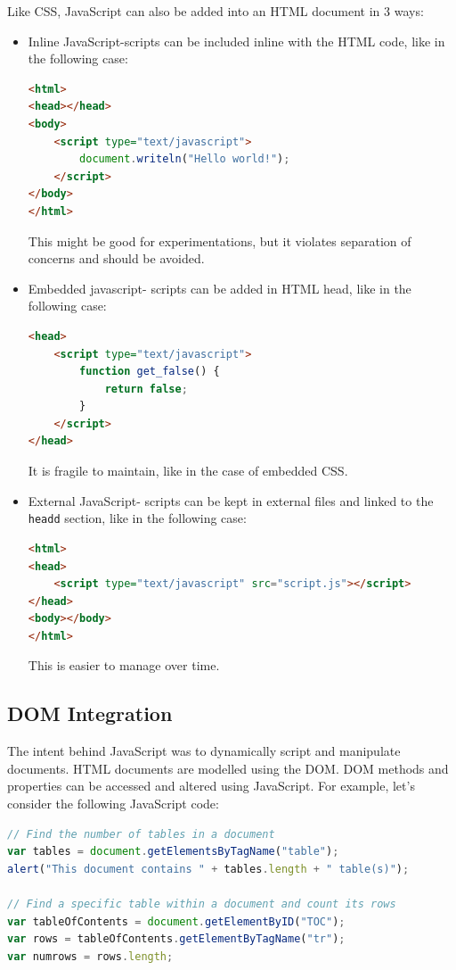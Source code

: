 \documentclass[a4paper, openany]{memoir}
\begin{document}
\noindent Like CSS, JavaScript can also be added into an HTML document in 3 ways:
\begin{itemize}
    \item Inline JavaScript-scripts can be included inline with the HTML code, like in the following case:
    \begin{lstlisting}[language=html]
<html>
<head></head>
<body>
    <script type="text/javascript">
        document.writeln("Hello world!");
    </script>
</body>
</html>\end{lstlisting}
    This might be good for experimentations, but it violates separation of concerns and should be avoided.
    
    \item Embedded javascript- scripts can be added in HTML head, like in the following case:
    \begin{lstlisting}[language=html]
<head>
    <script type="text/javascript">
        function get_false() {
            return false;
        }
    </script>
</head>\end{lstlisting}
    It is fragile to maintain, like in the case of embedded CSS.
    
    \item External JavaScript- scripts can be kept in external files and linked to the \texttt{headd} section, like in the following case:
    \begin{lstlisting}[language=html]
<html>
<head>
    <script type="text/javascript" src="script.js"></script>
</head>
<body></body>
</html>\end{lstlisting}
    This is easier to manage over time.
\end{itemize}

\subsection{DOM Integration}
The intent behind JavaScript was to dynamically script and manipulate documents. HTML documents are modelled using the DOM. DOM methods and properties can be accessed and altered using JavaScript. For example, let's consider the following JavaScript code:
\begin{lstlisting}[language=javascript]
// Find the number of tables in a document
var tables = document.getElementsByTagName("table");
alert("This document contains " + tables.length + " table(s)");

// Find a specific table within a document and count its rows
var tableOfContents = document.getElementByID("TOC");
var rows = tableOfContents.getElementByTagName("tr");
var numrows = rows.length;
\end{lstlisting}
\end{document}
